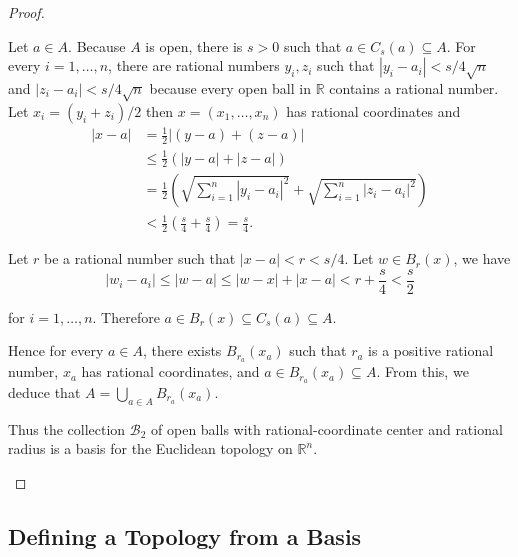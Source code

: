 \begin{proof}
\begin{enumerate}[label={(\alph*)}]
		      Let $a\in A$. Because $A$ is open, there is $s > 0$ such that $a\in C_{s}(a)\subseteq A$. For every $i = 1,\ldots, n$, there are rational numbers $y_{i}, z_{i}$ such that $\left\vert{y_{i} - a_{i}}\right\vert < s/4\sqrt{n}$ and $\left\vert{z_{i} - a_{i}}\right\vert < s/4\sqrt{n}$ because every open ball in $\mathbb{R}$ contains a rational number. Let $x_{i} = (y_{i} + z_{i})/2$ then $x = (x_{1}, \ldots, x_{n})$ has rational coordinates and
		      \begin{align*}
			      \left\vert{x - a}\right\vert & = \frac{1}{2}\left\vert{(y - a) + (z - a)}\right\vert                                                                                                         \\
			                                   & \leq \frac{1}{2}\left(\left\vert{y - a}\right\vert + \left\vert{z - a}\right\vert\right)                                                                      \\
			                                   & = \frac{1}{2}\left( \sqrt{\sum^{n}_{i=1}{\left\vert{y_{i} - a_{i}}\right\vert}^{2}} + \sqrt{\sum^{n}_{i=1}{\left\vert{z_{i} - a_{i}}\right\vert}^{2}} \right) \\
			                                   & < \frac{1}{2}\left( \frac{s}{4} + \frac{s}{4} \right) = \frac{s}{4}.
		      \end{align*}

		      Let $r$ be a rational number such that $\left\vert{x - a}\right\vert < r < s/4$. Let $w\in B_{r}(x)$, we have
		      \[
			      \left\vert{w_{i} - a_{i}}\right\vert \leq \left\vert{w - a}\right\vert \leq \left\vert{w - x}\right\vert + \left\vert{x - a}\right\vert < r + \frac{s}{4} < \frac{s}{2}
		      \]

		      for $i = 1,\ldots, n$. Therefore $a\in B_{r}(x)\subseteq C_{s}(a)\subseteq A$.

		      Hence for every $a\in A$, there exists $B_{r_{a}}(x_{a})$ such that $r_{a}$ is a positive rational number, $x_{a}$ has rational coordinates, and $a\in B_{r_{a}}(x_{a})\subseteq A$. From this, we deduce that $A = \bigcup_{a\in A}B_{r_{a}}(x_{a})$.

		      Thus the collection $\mathscr{B}_{2}$ of open balls with rational-coordinate center and rational radius is a basis for the Euclidean topology on $\mathbb{R}^{n}$.
	\end{enumerate}
\end{proof}

\subsection*{Defining a Topology from a Basis}

